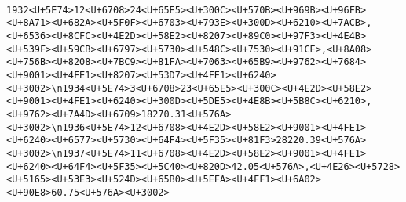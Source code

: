 \documentclass[
]{article}
\begin{document}
\begin{verbatim}
                                                                                                                                                                                                                                                                                                                                                                                                                                                                                                                                                       1932<U+5E74>12<U+6708>24<U+65E5><U+300C><U+570B><U+969B><U+96FB><U+8A71><U+682A><U+5F0F><U+6703><U+793E><U+300D><U+6210><U+7ACB>,<U+6536><U+8CFC><U+4E2D><U+58E2><U+8207><U+89C0><U+97F3><U+4E4B><U+539F><U+59CB><U+6797><U+5730><U+548C><U+7530><U+91CE>,<U+8A08><U+756B><U+8208><U+7BC9><U+81FA><U+7063><U+65B9><U+9762><U+7684><U+9001><U+4FE1><U+8207><U+53D7><U+4FE1><U+6240><U+3002>\n1934<U+5E74>3<U+6708>23<U+65E5><U+300C><U+4E2D><U+58E2><U+9001><U+4FE1><U+6240><U+300D><U+5DE5><U+4E8B><U+5B8C><U+6210>,<U+9762><U+7A4D><U+6709>18270.31<U+576A><U+3002>\n1936<U+5E74>12<U+6708><U+4E2D><U+58E2><U+9001><U+4FE1><U+6240><U+6577><U+5730><U+64F4><U+5F35><U+81F3>28220.39<U+576A><U+3002>\n1937<U+5E74>11<U+6708><U+4E2D><U+58E2><U+9001><U+4FE1><U+6240><U+64F4><U+5F35><U+5C40><U+820D>42.05<U+576A>,<U+4E26><U+5728><U+5165><U+53E3><U+524D><U+65B0><U+5EFA><U+4FF1><U+6A02><U+90E8>60.75<U+576A><U+3002>

\end{verbatim}
\end{document}
